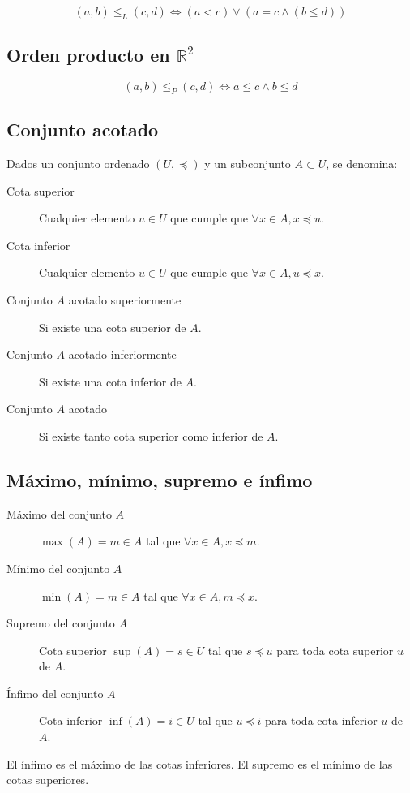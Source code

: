\[
(a,b) \leq_L (c,d) \Leftrightarrow (a < c) \vee (a = c \wedge (b \leq d))
\]

\subsection{Orden producto en $\mathbb{R}^2$}

\[
(a,b) \leq_P (c,d) \Leftrightarrow a \leq c \wedge b \leq d
\]

\subsection{Conjunto acotado}

Dados un conjunto ordenado $(U,\preceq)$ y un subconjunto $A \subset U$, se denomina:
\begin{description}
\item[Cota superior] Cualquier elemento $u \in U$ que cumple que $\forall  x \in A, x \preceq u$.
\item[Cota inferior] Cualquier elemento $u \in U$ que cumple que $\forall  x \in A, u \preceq x$.
\item[Conjunto $A$ acotado superiormente] Si existe una cota superior de $A$.
\item[Conjunto $A$ acotado inferiormente] Si existe una cota inferior de $A$.
\item[Conjunto $A$ acotado] Si existe tanto cota superior como inferior de $A$.
\end{description}

\subsection{Máximo, mínimo, supremo e ínfimo}
\begin{description}
\item[Máximo del conjunto $A$] $\max(A)= m \in A$ tal que $\forall x \in A, x \preceq m$.
\item[Mínimo del conjunto $A$] $\min(A)= m \in A$ tal que $\forall x \in A, m \preceq x$.
\item[Supremo del conjunto $A$] Cota superior $\sup(A)=s \in U$ tal que $s \preceq u$ para toda cota superior $u$ de $A$.
\item[Ínfimo del conjunto $A$] Cota inferior $\inf(A)=i \in U$ tal que $u \preceq i$ para toda cota inferior $u$ de $A$.
\end{description}

El ínfimo es el máximo de las cotas inferiores. El supremo es el mínimo de las cotas superiores.

